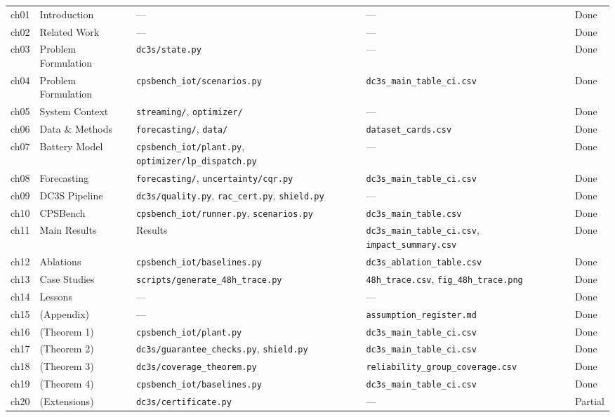 \begin{small}
\begin{longtable}{@{}p{1.2cm}p{2.8cm}p{2.2cm}p{3.2cm}p{1.8cm}@{}}
ch01 & Introduction & --- & --- & Done \\
ch02 & Related Work & --- & --- & Done \\
ch03 & Problem Formulation & \texttt{dc3s/state.py} & --- & Done \\
ch04 & Problem Formulation & \texttt{cpsbench\_iot/scenarios.py} & \texttt{dc3s\_main\_table\_ci.csv} & Done \\
ch05 & System Context & \texttt{streaming/}, \texttt{optimizer/} & --- & Done \\
ch06 & Data \& Methods & \texttt{forecasting/}, \texttt{data/} & \texttt{dataset\_cards.csv} & Done \\
ch07 & Battery Model & \texttt{cpsbench\_iot/plant.py}, \texttt{optimizer/lp\_dispatch.py} & --- & Done \\
ch08 & Forecasting & \texttt{forecasting/}, \texttt{uncertainty/cqr.py} & \texttt{dc3s\_main\_table\_ci.csv} & Done \\
ch09 & DC3S Pipeline & \texttt{dc3s/quality.py}, \texttt{rac\_cert.py}, \texttt{shield.py} & --- & Done \\
ch10 & CPSBench & \texttt{cpsbench\_iot/runner.py}, \texttt{scenarios.py} & \texttt{dc3s\_main\_table.csv} & Done \\
ch11 & Main Results & Results & \texttt{dc3s\_main\_table\_ci.csv}, \texttt{impact\_summary.csv} & Done \\
ch12 & Ablations & \texttt{cpsbench\_iot/baselines.py} & \texttt{dc3s\_ablation\_table.csv} & Done \\
ch13 & Case Studies & \texttt{scripts/generate\_48h\_trace.py} & \texttt{48h\_trace.csv}, \texttt{fig\_48h\_trace.png} & Done \\
ch14 & Lessons & --- & --- & Done \\
ch15 & (Appendix) & --- & \texttt{assumption\_register.md} & Done \\
ch16 & (Theorem 1) & \texttt{cpsbench\_iot/plant.py} & \texttt{dc3s\_main\_table\_ci.csv} & Done \\
ch17 & (Theorem 2) & \texttt{dc3s/guarantee\_checks.py}, \texttt{shield.py} & \texttt{dc3s\_main\_table\_ci.csv} & Done \\
ch18 & (Theorem 3) & \texttt{dc3s/coverage\_theorem.py} & \texttt{reliability\_group\_coverage.csv} & Done \\
ch19 & (Theorem 4) & \texttt{cpsbench\_iot/baselines.py} & \texttt{dc3s\_main\_table\_ci.csv} & Done \\
ch20 & (Extensions) & \texttt{dc3s/certificate.py} & --- & Partial \\

\end{longtable}
\end{small}
